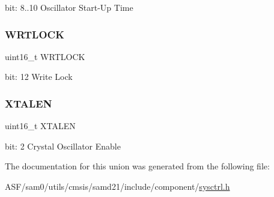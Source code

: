 bit\+: 8..10 Oscillator Start-\/\+Up Time \mbox{\label{union_s_y_s_c_t_r_l___x_o_s_c32_k___type_a356c7cc083fb5e02d9093189453a3e23}} 
\subsubsection{\texorpdfstring{WRTLOCK}{WRTLOCK}}
{\footnotesize\ttfamily uint16\+\_\+t W\+R\+T\+L\+O\+CK}

bit\+: 12 Write Lock \mbox{\label{union_s_y_s_c_t_r_l___x_o_s_c32_k___type_a213212644ef27e91b6ed7d8f995db6bf}} 
\subsubsection{\texorpdfstring{XTALEN}{XTALEN}}
{\footnotesize\ttfamily uint16\+\_\+t X\+T\+A\+L\+EN}

bit\+: 2 Crystal Oscillator Enable 

The documentation for this union was generated from the following file\+:\begin{DoxyCompactItemize}
\item 
A\+S\+F/sam0/utils/cmsis/samd21/include/component/\mbox{\hyperlink{component_2sysctrl_8h}{sysctrl.\+h}}\end{DoxyCompactItemize}
